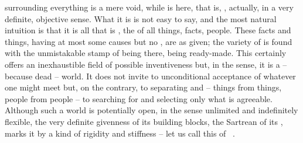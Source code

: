 

\pa\label{closed}  surrounding everything is a mere void, while
 is here, that is, , actually, in a very definite,
objective sense. What it is is not easy to say, and the most natural intuition
is that it is all that is , the  of all things, facts,
people. These facts and things, having at most some causes but no ,
are  as given; the variety of 
 is found with the unmistakable stamp of being there,
being ready-made.
This certainly offers an inexhaustible field of possible
inventiveness but, in the  sense, it is a  -- because
dead -- world. It
does not invite to unconditional acceptance of whatever one might meet but, on
the contrary, to separating and  -- things from things, people
from people -- to searching for and selecting
only what is agreeable. Although such a world is potentially open, in the sense
unlimited and indefinitely flexible, the very definite givenness of its building
blocks, the Sartrean  of its , marks it by a kind
of rigidity and stiffness -- 
let us call this  of \No\ .


